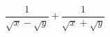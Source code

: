 \hspace*{2mm}\begin{minipage}[t]{\dimexpr\linewidth-2mm\relax}\vspace{0pt}
$\dfrac{1}{\sqrt{x}-\sqrt{y}}+\dfrac{1}{\sqrt{x}+\sqrt{y}}$\end{minipage}

